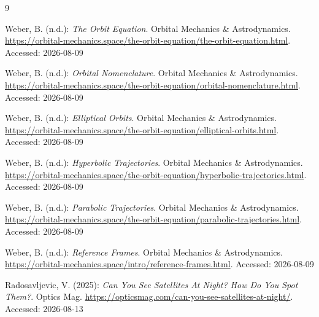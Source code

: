 \documentclass[11pt,a4paper]{article}
\begin{document}
	
	\begin{thebibliography}{9}
		\setlength{\itemsep}{4pt}       %
		\setlength{\parskip}{0pt}       %
		\setlength{\parsep}{0pt}        %
		
		Weber, B. (n.d.): \emph{The Orbit Equation}. Orbital Mechanics \& Astrodynamics.\newline
		\url{https://orbital-mechanics.space/the-orbit-equation/the-orbit-equation.html}.\newline
		Accessed: 2026-08-09
		
		Weber, B. (n.d.): \emph{Orbital Nomenclature}. Orbital Mechanics \& Astrodynamics.\newline
		\url{https://orbital-mechanics.space/the-orbit-equation/orbital-nomenclature.html}.\newline
		Accessed: 2026-08-09
		
		Weber, B. (n.d.): \emph{Elliptical Orbits}. Orbital Mechanics \& Astrodynamics.\newline
		\url{https://orbital-mechanics.space/the-orbit-equation/elliptical-orbits.html}.\newline
		Accessed: 2026-08-09
		
		Weber, B. (n.d.): \emph{Hyperbolic Trajectories}. Orbital Mechanics \& Astrodynamics.\newline
		\url{https://orbital-mechanics.space/the-orbit-equation/hyperbolic-trajectories.html}.\newline
		Accessed: 2026-08-09
		
		Weber, B. (n.d.): \emph{Parabolic Trajectories}. Orbital Mechanics \& Astrodynamics.\newline
		\url{https://orbital-mechanics.space/the-orbit-equation/parabolic-trajectories.html}.\newline
		Accessed: 2026-08-09
		
		Weber, B. (n.d.): \emph{Reference Frames}. Orbital Mechanics \& Astrodynamics.\newline
		\url{https://orbital-mechanics.space/intro/reference-frames.html}.\newline
		Accessed: 2026-08-09
		
		Radosavljevic, V. (2025): \emph{Can You See Satellites At Night? How Do You Spot Them?}.
		Optics Mag.
		\url{https://opticsmag.com/can-you-see-satellites-at-night/}.\newline
		Accessed: 2026-08-13
		

\end{thebibliography}
\end{document}
